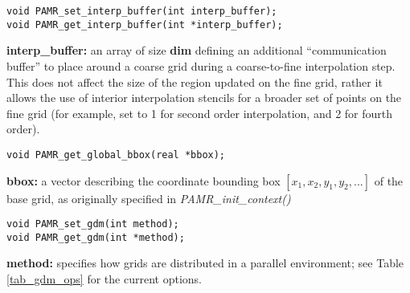 \documentclass[aps,amssymb,unsortedaddress,nofootinbib]{revtex4}
\def\lsep{\itemsep 0.05in}
\begin{document}

\begin{verbatim}
void PAMR_set_interp_buffer(int interp_buffer);
void PAMR_get_interp_buffer(int *interp_buffer);
\end{verbatim}
\begin{list}{}{\lsep}
\item {\bf *interp\_buffer:} an array of size {\bf dim} defining an additional ``communication buffer''
                      to place around a coarse grid during a coarse-to-fine interpolation step.
                      This does not affect the size of the region updated on the fine grid,
                      rather it allows the use of interior interpolation stencils for a broader
                      set of points on the fine grid (for example, set to 1 for second order interpolation,
                      and 2 for fourth order).
\end{list}


\begin{verbatim}
void PAMR_get_global_bbox(real *bbox);
\end{verbatim}
\begin{list}{}{\lsep}
\item {\bf *bbox:} a vector describing the coordinate bounding box $[x_1,x_2,y_1,y_2,...]$ of the base grid,
                   as originally specified in {\em PAMR\_init\_context()}
\end{list}


\begin{verbatim}
void PAMR_set_gdm(int method);
void PAMR_get_gdm(int *method);
\end{verbatim}
\begin{list}{}{\lsep}
\item {\bf method:} specifies how grids are distributed in a parallel environment; see 
                    Table \ref{tab_gdm_ops} for the current options.
\end{list}
\end{document}
